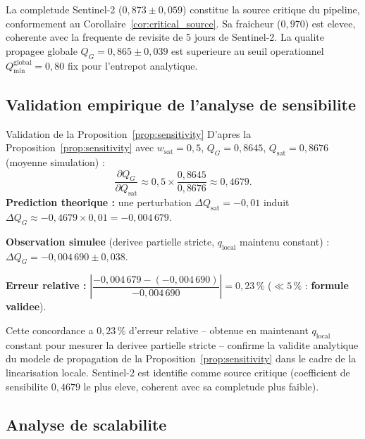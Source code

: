 \documentclass[12pt,a4paper]{article}
\theoremstyle{plain}
\theoremstyle{definition}
\theoremstyle{remark}
\begin{document}
	La completude Sentinel-2 ($0{,}873 \pm 0{,}059$) constitue la source
	critique du pipeline, conformement au Corollaire~\ref{cor:critical_source}.
	Sa fraicheur ($0{,}970$) est elevee, coherente avec la frequente de
	revisite de 5 jours de Sentinel-2. La qualite propagee globale
	$Q_G = 0{,}865 \pm 0{,}039$ est superieure au seuil operationnel
	$Q_{\min}^{\text{global}} = 0{,}80$ fix pour l'entrepot analytique.
	
	\subsection{Validation empirique de l'analyse de sensibilite}
	\label{subsec:sensitivity_validation}
	
	\begin{mathbox}{Validation de la Proposition~\ref{prop:sensitivity}}
		\noindent
		D'apres la Proposition~\ref{prop:sensitivity} avec $w_{\text{sat}}=0{,}5$,
		$Q_G=0{,}8645$, $Q_{\text{sat}}=0{,}8676$ (moyenne simulation) :
		\[
		\frac{\partial Q_G}{\partial Q_{\text{sat}}} \approx
		0{,}5 \times \frac{0{,}8645}{0{,}8676} \approx 0{,}4679.
		\]
		\textbf{Prediction theorique :} une perturbation $\Delta Q_{\text{sat}} = -0{,}01$
		induit $\Delta Q_G \approx -0{,}4679 \times 0{,}01 = -0{,}004\,679$.
		
		\noindent
		\textbf{Observation simulee} (derivee partielle stricte, $q_{\text{local}}$
		maintenu constant) : $\Delta Q_G = -0{,}004\,690 \pm 0{,}038$.
		
		\noindent
		\textbf{Erreur relative :}
		$\left|\dfrac{-0{,}004\,679 - (-0{,}004\,690)}{-0{,}004\,690}\right|
		= 0{,}23\,\%$ \quad ($\ll 5\,\%$ : \textbf{formule validee}).
	\end{mathbox}
	
	Cette concordance a $0{,}23\,\%$ d'erreur relative -- obtenue en
	maintenant $q_{\text{local}}$ constant pour mesurer la derivee
	partielle stricte -- confirme la validite analytique du modele
	de propagation de la Proposition~\ref{prop:sensitivity} dans le
	cadre de la linearisation locale. Sentinel-2 est identifie comme
	source critique (coefficient de sensibilite $0{,}4679$ le plus
	eleve, coherent avec sa completude plus faible).
	
	\subsection{Analyse de scalabilite}
	\label{subsec:scalabilite}
	
\end{document}
